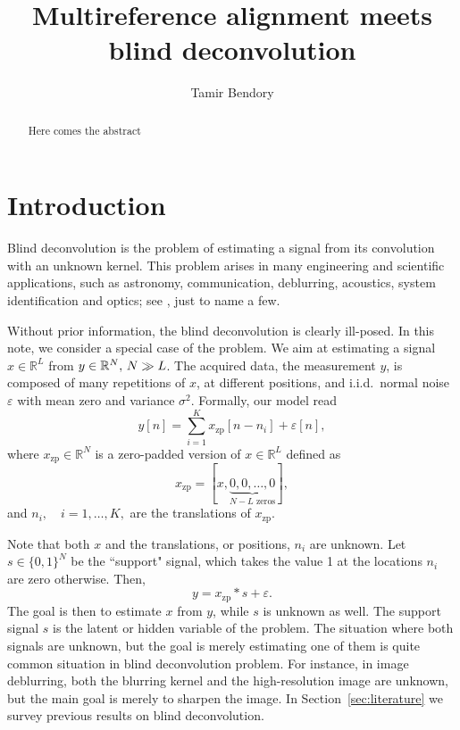 \documentclass[journal]{IEEEtran}
\numberwithin{equation}{section}
\numberwithin{figure}{section}
\theoremstyle{plain}
\theoremstyle{definition}
\theoremstyle{remark}
\theoremstyle{plain}
\theoremstyle{remark}
\theoremstyle{plain}
\theoremstyle{plain}
\newcommand{\RL}{\mathbb{R}^L}
\newcommand{\RN}{\mathbb{R}^N}
\newcommand{\xz}{x_{\textrm{zp}}}
\begin{document}


\title{Multireference alignment meets blind deconvolution}
\author{Tamir Bendory}
\maketitle

\begin{abstract}
	Here comes the abstract
\end{abstract}


\section{Introduction} \label{sec:introduction}

Blind deconvolution is the problem of estimating a signal from its convolution with an unknown kernel. This problem arises in many engineering and scientific applications, such as astronomy, communication, deblurring, acoustics, system identification and optics; see   \cite{jefferies1993restoration,tong1994blind,chan1998total,campisi2016blind,kundur1996blind,levin2011understanding,shalvi1990new,levin2009understanding,krishnan2011blind,ayers1988iterative,michaeli2014blind,lin2005relevant,abed1997blind}, just to name a few.

Without prior information, the blind deconvolution is clearly ill-posed. In this note, we consider a special case of the problem. We aim at estimating a signal $x\in\RL$ from $y\in\RN, \thinspace N\gg L$. The acquired data, the measurement $y$, is composed of many repetitions of $x$, at different positions, and i.i.d.\ normal noise $\varepsilon$ with mean zero and variance $\sigma^2$. 
Formally, our model read
\begin{equation}
y[n] = \sum_{i=1}^K \xz [n-n_i] + \varepsilon[n], 
\end{equation}
where $\xz\in\RN$ is a zero-padded version of $x\in\RL$  
defined as $$\xz  = [x, \underbrace{0,0,\ldots,0}_{N-L \text{ zeros}}],$$ and
 $n_i,\quad i=1,\ldots,K,$ are the translations of $\xz$.


Note that both $x$ and the translations, or positions, $n_i$ are unknown. Let $s\in\{0,1\}^N$ be the ``support" signal, which takes the value 1 at the locations $n_i$ are zero otherwise. 
Then, 
\begin{equation}
y = \xz \ast s + \varepsilon.
\end{equation}
The goal is then to estimate $x$ from $y$, while $s$ is unknown as well. The support signal $s$ is the latent or hidden variable of the problem. The situation where both signals are unknown, but the goal is merely estimating one of them  is quite common situation in blind deconvolution problem. For instance, in image deblurring, both the blurring kernel and the high-resolution image are unknown, but the main goal is merely to sharpen the image. In Section~\ref{sec:literature} we survey previous results on blind deconvolution.
\end{document}
